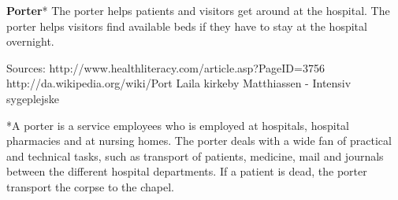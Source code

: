 \textbf{Porter}*
The porter helps patients and visitors get around at the hospital. The porter helps visitors find available beds if they have to stay at the hospital overnight. 

Sources:
http://www.healthliteracy.com/article.asp?PageID=3756
http://da.wikipedia.org/wiki/Port%
Laila kirkeby Matthiassen - Intensiv sygeplejske

*A porter is a service employees who is employed at hospitals, hospital pharmacies and at nursing homes. The porter deals with a wide fan of practical and technical tasks, such as transport of patients, medicine, mail and journals between the different hospital departments. If a patient is dead, the porter transport the corpse to the chapel.